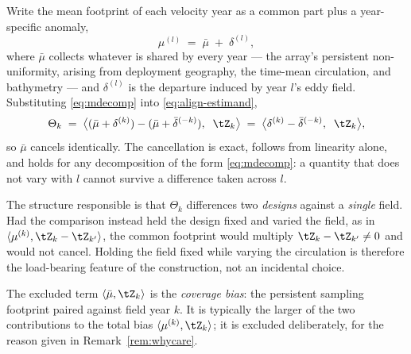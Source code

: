 \begin{remark}
\label{rem:coverage}
Write the mean footprint of each velocity year as a common part plus a year-specific anomaly,
\begin{equation}
  \label{eq:mdecomp}
  \mu^{(l)} \;=\; \bar{\mu} \;+\; \delta^{(l)},
\end{equation}
where $\bar{\mu}$ collects whatever is shared by every year --- the array's persistent
non-uniformity, arising from deployment geography, the time-mean circulation, and bathymetry ---
and $\delta^{(l)}$ is the departure induced by year $l$'s eddy field. Substituting
\eqref{eq:mdecomp} into \eqref{eq:align-estimand},
\begin{equation}
  \Theta_k
  \;=\; \big\langle (\bar{\mu} + \delta^{(k)}) - (\bar{\mu} + \bar{\delta}^{(-k)}),\;\; \tZ_k\big\rangle
  \;=\; \big\langle \delta^{(k)} - \bar{\delta}^{(-k)},\;\; \tZ_k \big\rangle ,
\end{equation}
so $\bar{\mu}$ cancels identically. The cancellation is exact, follows from linearity alone, and
holds for any decomposition of the form \eqref{eq:mdecomp}: a quantity that does not vary with $l$
cannot survive a difference taken across $l$.

The structure responsible is that $\Theta_k$ differences two \emph{designs} against a
\emph{single} field. Had the comparison instead held the design fixed and varied the field, as in
$\langle \mu^{(k)}, \tZ_k - \tZ_{k'}\rangle$, the common footprint would multiply
$\tZ_k - \tZ_{k'} \neq 0$ and would not cancel. Holding the field fixed while varying the
circulation is therefore the load-bearing feature of the construction, not an incidental choice.

The excluded term $\langle \bar{\mu}, \tZ_k\rangle$ is the \emph{coverage bias}: the persistent
sampling footprint paired against field year $k$. It is typically the larger of the two
contributions to the total bias $\langle \mu^{(k)}, \tZ_k\rangle$; it is excluded deliberately, for
the reason given in Remark~\ref{rem:whycare}.
\end{remark}

